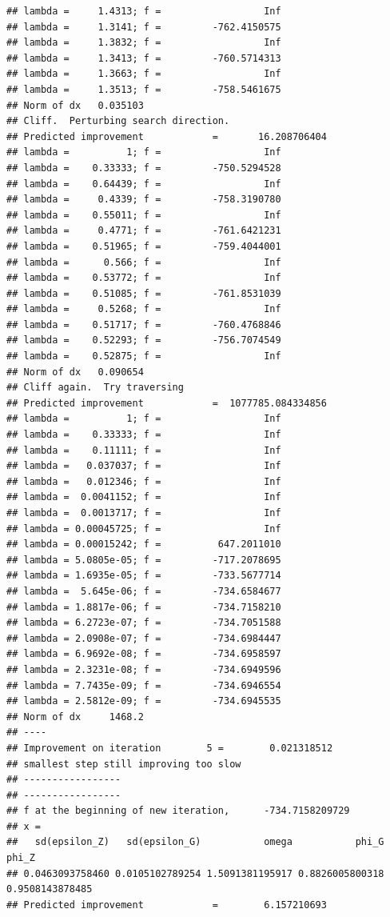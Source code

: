 \documentclass[12pt,a4paper,]{article}
\newcommand{\0}{\mathbf{0}}
\begin{document}
\begin{verbatim}
## lambda =     1.4313; f =                  Inf 
## lambda =     1.3141; f =         -762.4150575 
## lambda =     1.3832; f =                  Inf 
## lambda =     1.3413; f =         -760.5714313 
## lambda =     1.3663; f =                  Inf 
## lambda =     1.3513; f =         -758.5461675 
## Norm of dx   0.035103
## Cliff.  Perturbing search direction. 
## Predicted improvement            =       16.208706404
## lambda =          1; f =                  Inf 
## lambda =    0.33333; f =         -750.5294528 
## lambda =    0.64439; f =                  Inf 
## lambda =     0.4339; f =         -758.3190780 
## lambda =    0.55011; f =                  Inf 
## lambda =     0.4771; f =         -761.6421231 
## lambda =    0.51965; f =         -759.4044001 
## lambda =      0.566; f =                  Inf 
## lambda =    0.53772; f =                  Inf 
## lambda =    0.51085; f =         -761.8531039 
## lambda =     0.5268; f =                  Inf 
## lambda =    0.51717; f =         -760.4768846 
## lambda =    0.52293; f =         -756.7074549 
## lambda =    0.52875; f =                  Inf 
## Norm of dx   0.090654
## Cliff again.  Try traversing
## Predicted improvement            =  1077785.084334856
## lambda =          1; f =                  Inf 
## lambda =    0.33333; f =                  Inf 
## lambda =    0.11111; f =                  Inf 
## lambda =   0.037037; f =                  Inf 
## lambda =   0.012346; f =                  Inf 
## lambda =  0.0041152; f =                  Inf 
## lambda =  0.0013717; f =                  Inf 
## lambda = 0.00045725; f =                  Inf 
## lambda = 0.00015242; f =          647.2011010 
## lambda = 5.0805e-05; f =         -717.2078695 
## lambda = 1.6935e-05; f =         -733.5677714 
## lambda =  5.645e-06; f =         -734.6584677 
## lambda = 1.8817e-06; f =         -734.7158210 
## lambda = 6.2723e-07; f =         -734.7051588 
## lambda = 2.0908e-07; f =         -734.6984447 
## lambda = 6.9692e-08; f =         -734.6958597 
## lambda = 2.3231e-08; f =         -734.6949596 
## lambda = 7.7435e-09; f =         -734.6946554 
## lambda = 2.5812e-09; f =         -734.6945535 
## Norm of dx     1468.2
## ----
## Improvement on iteration        5 =        0.021318512
## smallest step still improving too slow
## -----------------
## -----------------
## f at the beginning of new iteration,      -734.7158209729 
## x =
##   sd(epsilon_Z)   sd(epsilon_G)           omega           phi_G           phi_Z 
## 0.0463093758460 0.0105102789254 1.5091381195917 0.8826005800318 0.9508143878485 
## Predicted improvement            =        6.157210693

\end{verbatim}
\end{document}
